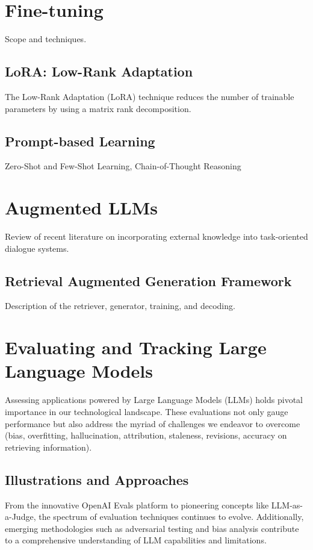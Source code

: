 \begin{itemize}
\section{Fine-tuning}
Scope and techniques.

\subsection{LoRA: Low-Rank Adaptation}
The Low-Rank Adaptation (LoRA) technique reduces the number of trainable parameters by using a matrix rank decomposition.

\subsection{Prompt-based Learning}
Zero-Shot and Few-Shot Learning, Chain-of-Thought Reasoning

\section{Augmented LLMs}
Review of recent literature on incorporating external knowledge into task-oriented dialogue systems.

\subsection{Retrieval Augmented Generation Framework}
Description of the retriever, generator, training, and decoding.

\section{Evaluating and Tracking Large Language Models}
Assessing applications powered by Large Language Models (LLMs) holds pivotal importance in our technological landscape. These evaluations not only gauge performance but also address the myriad of challenges we endeavor to overcome (bias, overfitting, hallucination, attribution, staleness, revisions, accuracy on retrieving information).

\subsection{Illustrations and Approaches}

From the innovative OpenAI Evals platform to pioneering concepts like LLM-as-a-Judge, the spectrum of evaluation techniques continues to evolve. Additionally, emerging methodologies such as adversarial testing and bias analysis contribute to a comprehensive understanding of LLM capabilities and limitations.


\end{itemize}
